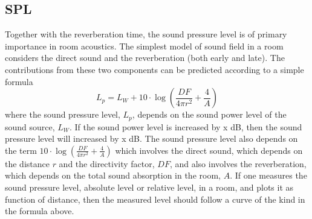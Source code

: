 \documentclass{article}
\begin{document}
\subsection{SPL }


Together with the reverberation time, the sound pressure level is of primary importance in room acoustics. The simplest model of sound field in a room considers the direct sound and the reverberation (both early and late). The contributions from these two components can be predicted according to a simple formula
\[
L_p = L_W + 10\cdot \log\left( \frac{DF}{4 \pi r^2}  + \frac{4}{A} \right)
\]
where the sound pressure level, $L_p$, depends on the sound power level of the sound source, $L_W$. If the sound power level is increased by x dB, then the sound pressure level will increased by x dB. The sound pressure level also depends on the term $10\cdot \log\left( \frac{DF}{4 \pi r^2}  + \frac{4}{A} \right)$ which involves the direct sound, which depends on the distance $r$ and the directivity factor, $DF$, and also involves the reverberation, which depends on the total sound absorption in the room, $A$. If one measures the sound pressure level, absolute level or relative level, in a room, and plots it as function of distance, then the measured level should follow a curve of the kind in the formula above.
\end{document}
